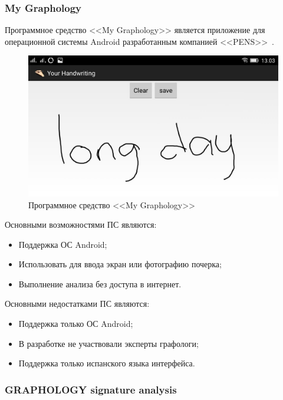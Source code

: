 \subsubsection{My Graphology}
\label{sub:domain:analogs:my_graphology}

Программное средство <<My Graphology>> является приложение для операционной системы Android разработанным компанией <<PENS>>~\cite{analogs_my_graphology}.

\begin{figure}[h]
    \centering
    \label{fig:domain:analogs:my_graphology}
    \includegraphics[width=0.4\textheight]{figures/analog_my_graphology.jpeg}
    \caption{Программное средство <<My Graphology>>}
\end{figure}

Основными возможностями ПС являются:
\begin{itemize}
  \item Поддержка ОС Android;
  \item Использовать для ввода экран или фотографию почерка;
  \item Выполнение анализа без доступа в интернет.
\end{itemize}

Основными недостатками ПС являются:
\begin{itemize}
  \item Поддержка только ОС Android;
  \item В разработке не участвовали эксперты графологи;
  \item Поддержка только испанского языка интерфейса.
\end{itemize}

\subsubsection{GRAPHOLOGY signature analysis}
\label{sub:domain:analogs:graphology_sign_analysis}

